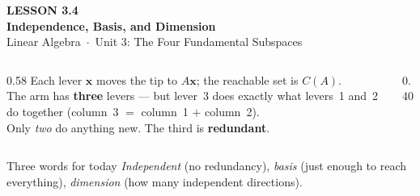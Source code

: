 \documentclass[aspectratio=169, 11pt]{beamer}
\newcommand{\xx}{\mathbf{x}}
\begin{document}
{
\begin{frame}[plain]
  \vspace{2.8cm}\hspace{0.55cm}%
  \begin{minipage}{0.9\textwidth}
    {\color{goldacc}\bfseries\small LESSON 3.4}\\[0.5cm]
    {\color{white}\bfseries\LARGE Independence, Basis, and Dimension}\\[1.0cm]
    {\color{blushmid}\small Linear Algebra~$\cdot$~Unit 3: The Four Fundamental Subspaces}
  \end{minipage}
\end{frame}
}

\begin{frame}[t, plain]
  \begin{columns}[T]
    \begin{column}{0.58\textwidth}
      Each lever $\xx$ moves the tip to $A\xx$; the reachable set is $C(A)$.\\[6pt]
      The arm has \textbf{three} levers --- but lever~3 does exactly what levers~1 and~2 do together
      (column~3 $=$ column~1 $+$ column~2).\\[6pt]
      Only \emph{two} do anything new. The third is \textbf{redundant}.
    \end{column}
    \begin{column}{0.40\textwidth}
      \centering
    \end{column}
  \end{columns}
  \vspace{2pt}
  \begin{block}{Three words for today}
    \emph{Independent} (no redundancy), \emph{basis} (just enough to reach everything), \emph{dimension}
    (how many independent directions).
  \end{block}
\end{frame}
\end{document}
